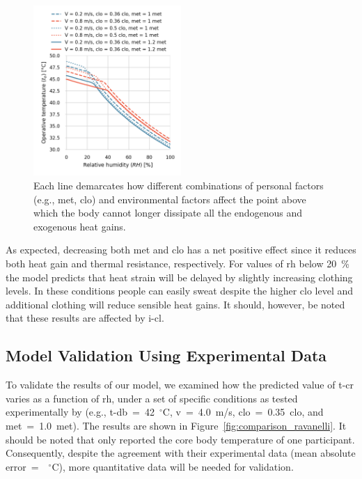 \begin{figure}[thb!]
    \centering
    \includegraphics[width=0.5\textwidth]{figures/met_clo}
    \caption{Each line demarcates how different combinations of personal factors (e.g., \ac{met}, \ac{clo}) and environmental factors affect the point above which the body cannot longer dissipate all the endogenous and exogenous heat gains.}
    \label{fig:met_clo}
\end{figure}

As expected, decreasing both \ac{met} and \ac{clo} has a net positive effect since it reduces both heat gain and thermal resistance, respectively.
For values of \ac{rh} below 20~\% the model predicts that heat strain will be delayed by slightly increasing clothing levels.
In these conditions people can easily sweat despite the higher clo level and additional clothing will reduce sensible heat gains.
It should, however, be noted that these results are affected by \ac{i-cl}.

\subsection{Model Validation Using Experimental Data}\label{subsec:model-validation-experimental-data}

To validate the results of our model, we examined how the predicted value of \ac{t-cr} varies as a function of \ac{rh}, under a set of specific conditions as tested experimentally by  (e.g., \ac{t-db}~=~42~$^{\circ}$C, \ac{v}~=~4.0~m/s, \ac{clo}~=~0.35~clo, and \ac{met}~=~1.0~met).
The results are shown in Figure~\ref{fig:comparison_ravanelli}.
It should be noted that  only reported the core body temperature of one participant.
Consequently, despite the agreement with their experimental data (mean absolute error~=~~$^{\circ}$C), more quantitative data will be needed for validation.

